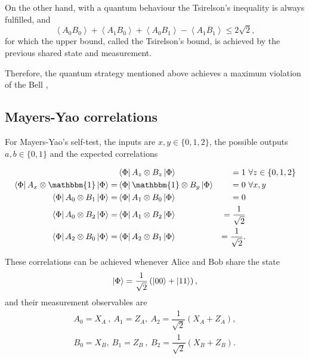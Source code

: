 On the other hand, with a quantum behaviour the Tsirelson's inequality is always fulfilled, and  \cite{cirelson_quantum_1980}
\begin{equation}
    \left< A_0 B_0\right> + \left< A_1 B_0\right> + \left< A_0 B_1 \right>  - \left< A_1 B_1 \right>  \leq 2 \sqrt{2},
\end{equation} 
for which the upper bound, called the Tsirelson's bound, is achieved by the previous shared state and measurement.

Therefore, the quantum strategy mentioned above achieves a maximum violation of the Bell
,


\subsection{Mayers-Yao correlations}

For Mayers-Yao's self-test, the inputs are $x,y \in \{0,1,2\}$, the possible outputs
$a,b \in \{0,1\}$ and the expected correlations

\begin{equation}\label{eq:mayers-yao-correlations}
\begin{aligned}
 &\bra{\Phi} A_z \otimes B_z \ket{\Phi} & = 1 &\ \forall z \in \{0,1,2\} \\
\bra{\Phi} A_x \otimes \mathbbm{1} \ket{\Phi}  = & \bra{\Phi} \mathbbm{1} \otimes B_y \ket{\Phi} & = 0  &\ \forall x,y  \\ 
\bra{\Phi} A_0 \otimes B_1 \ket{\Phi} = & \bra{\Phi} A_1 \otimes B_0 \ket{\Phi} & = 0  &\\ 
\bra{\Phi} A_0 \otimes B_2\ket{\Phi} = & \bra{\Phi} A_1 \otimes B_2 \ket{\Phi} & = \dfrac{1}{\sqrt{2}} &\\ 
\bra{\Phi} A_2 \otimes B_0 \ket{\Phi} = & \bra{\Phi} A_2 \otimes B_1 \ket{\Phi} & = \dfrac{1}{\sqrt{2}} \text{.} & \\ 
\end{aligned}
\end{equation}


These correlations can be achieved whenever Alice and Bob share the state 
\begin{equation*}
    \ket{\Phi} = \dfrac{1}{\sqrt{2}} \left( \ket{00} +\ket{11}\right)\text{,}
\end{equation*}
and their measurement observables are 
\begin{equation*}
\begin{aligned}
        A_0 = X_A   \ , \  A_1 = Z_A  , \ A_2 = \dfrac{1}{\sqrt{2}}  (X_A + Z_A), \\
        B_0 = X_B   , \  B_1 = Z_B  \ , \ B_2 = \dfrac{1}{\sqrt{2}}  (X_B + Z_B) .\\
\end{aligned}
\end{equation*}

\newpage